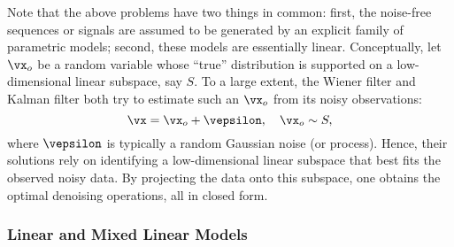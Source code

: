 \documentclass[../../book-main.tex]{subfiles}
\begin{document}
Note that the above problems have two things in common: first, the noise-free sequences or signals are assumed to be generated by an explicit family of parametric models; second, these models are essentially linear. Conceptually, let \(\vx_{o}\) be a random variable whose ``true'' distribution is supported on a low-dimensional linear subspace, say \(S\). To a large extent, the Wiener filter and Kalman filter both try to estimate such an \(\vx_{o}\) from its noisy observations:
\begin{equation}
    \vx = \vx_{o} + \vepsilon, \quad \vx_{o} \sim S,
\end{equation}
where \(\vepsilon\) is typically a random Gaussian noise (or process). Hence, their solutions rely on identifying a low-dimensional linear subspace that best fits the observed noisy data. By projecting the data onto this subspace, one obtains the optimal denoising operations, all in closed form.


\subsubsection{Linear and Mixed Linear Models}
\label{sec:PCA-ICA}
\end{document}
